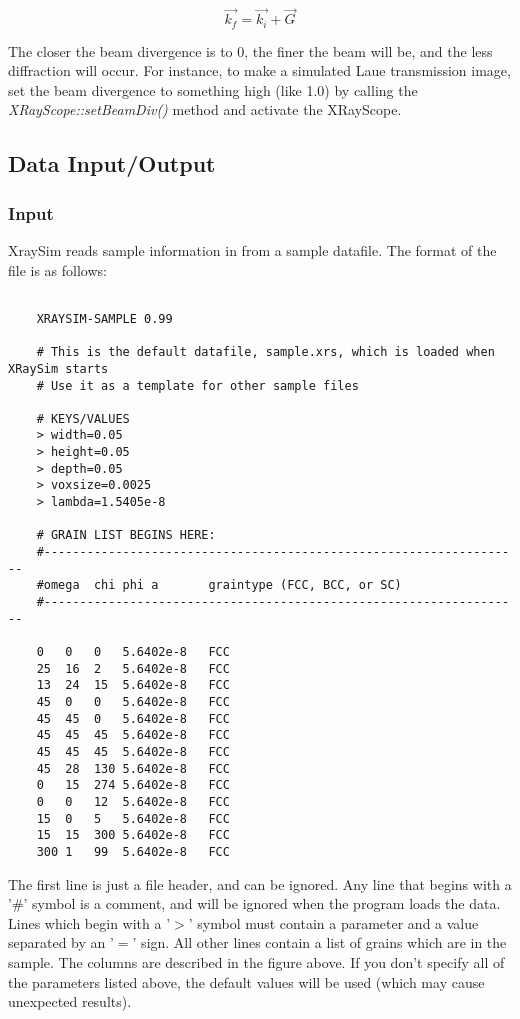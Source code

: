 \documentclass{article}
\begin{document}
	\begin{equation} \label{KF}
	\vec{k_f} = \vec{k_i} + \vec{G}		
	\end{equation}

The closer the beam divergence is to 0, the finer the beam will be,
and the less diffraction will occur.  For instance, to make a
simulated Laue transmission image, set the beam divergence to
something high (like 1.0) by calling the {\em XRayScope::setBeamDiv()}
method and activate the XRayScope.


\subsection{Data Input/Output}

\subsubsection{Input}
XraySim reads sample information in from a sample datafile.  The
format of the file is as follows:

\begin{verbatim}
    
    XRAYSIM-SAMPLE 0.99

    # This is the default datafile, sample.xrs, which is loaded when XRaySim starts
    # Use it as a template for other sample files

    # KEYS/VALUES
    > width=0.05 
    > height=0.05 
    > depth=0.05 
    > voxsize=0.0025
    > lambda=1.5405e-8

    # GRAIN LIST BEGINS HERE:
    #------------------------------------------------------------------- 
    #omega  chi phi a       graintype (FCC, BCC, or SC)
    #------------------------------------------------------------------- 

    0   0   0   5.6402e-8   FCC
    25  16  2   5.6402e-8   FCC
    13  24  15  5.6402e-8   FCC
    45  0   0   5.6402e-8   FCC
    45  45  0   5.6402e-8   FCC
    45  45  45  5.6402e-8   FCC
    45  45  45  5.6402e-8   FCC
    45  28  130 5.6402e-8   FCC
    0   15  274 5.6402e-8   FCC
    0   0   12  5.6402e-8   FCC
    15  0   5   5.6402e-8   FCC
    15  15  300 5.6402e-8   FCC
    300 1   99  5.6402e-8   FCC

\end{verbatim}


The first line is just a file header, and can be ignored.  Any line
that begins with a '\#' symbol is a comment, and will be ignored when
the program loads the data. Lines which begin with a '$>$' symbol
must contain a parameter and a value separated by an '$=$' sign. All
other lines contain a list of grains which are in the sample.  The
columns are described in the figure above.  If you don't specify all of
the parameters listed above, the default values will be used (which
may cause unexpected results).
\end{document}
